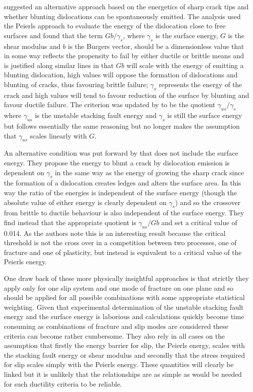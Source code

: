 \citet{rice1974} suggested an alternative approach based on the energetics of sharp crack tips and whether blunting dislocations can be spontaneously emitted. The analysis used the Peierls approach to evaluate the energy of the dislocation close to free surfaces and found that the term $Gb/\gamma_s$, where $\gamma_s$ is the surface energy, $G$ is the shear modulus and $b$ is the Burgers vector, should be a dimensionless value that in some way reflects the propensity to fail by either ductile or brittle means and is justified along similar lines in that $Gb$ will scale with the energy of emitting a blunting dislocation, high values will oppose the formation of dislocations and blunting of cracks, thus favouring brittle failure; $\gamma_s$ represents the energy of the crack and high values will tend to favour reduction of the surface by blunting and favour ductile failure. The criterion was updated by \citet{Rice1992} to be the quotient $\gamma_{us}/ \gamma_s$ where $\gamma_{us}$ is the unstable stacking fault energy and $\gamma_s$ is still the surface energy but follows essentially the same reasoning but no longer makes the assumption that $\gamma_{us}$ scales linearly with $G$.

An alternative condition was put forward by \citet{Zhou1994} that does not include the surface energy. They propose the energy to blunt a crack by dislocation emission is dependent on $\gamma_s$ in the same way as the energy of growing the sharp crack since the formation of a dislocation creates ledges and alters the surface area. In this way the ratio of the energies is independent of the surface energy (though the absolute value of either energy is clearly dependent on $\gamma_s$) and so the crossover from brittle to ductile behaviour is also independent of the surface energy. They find instead that the appropriate quotient is $\gamma_{us} / Gb$ and set a critical value of 0.014. As the authors note this is an interesting result because the critical threshold is not the cross over in a competition between two processes, one of fracture and one of plasticity, but instead is equivalent to a critical value of the Peierls energy.

One draw back of these more physically insightful approaches is that strictly they apply only for one slip system and one mode of fracture on one plane and so should be applied for all possible combinations with some appropriate statistical weighting. Given that experimental determination of the unstable stacking fault energy and the surface energy is laborious and calculations quickly become time consuming as combinations of fracture and slip modes are considered these criteria can become rather cumbersome. They also rely in all cases on the assumption that firstly the energy barrier for slip, the Peierls energy, scales with the stacking fault energy or shear modulus and secondly that the stress required for slip scales simply with the Peierls energy. These quantities will clearly be linked but it is unlikely that the relationships are as simple as would be needed for such ductility criteria to be reliable.


